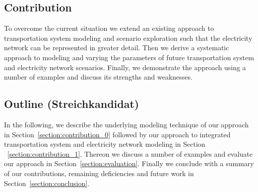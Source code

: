 \subsection{Contribution}

To overcome the current situation we extend an existing approach to transportation system modeling and scenario exploration such that the electricity network can be represented in greater detail. Then we derive a systematic approach to modeling and varying the parameters of future transportation system and electricity network scenarios. Finally, we demonstrate the approach using a number of examples and discuss its strengths and weaknesses.

\subsection{Outline (Streichkandidat)}

In the following, we describe the underlying modeling technique of our approach in Section~\ref{section:contribution_0} followed by our approach to integrated transportation system and electricity network modeling in Section ~\ref{section:contribution_1}. Thereon we discuss a number of examples and evaluate our approach in Section~\ref{section:evaluation}. Finally we conclude with a summary of our contributions, remaining deficiencies and future work in Section~\ref{section:conclusion}.